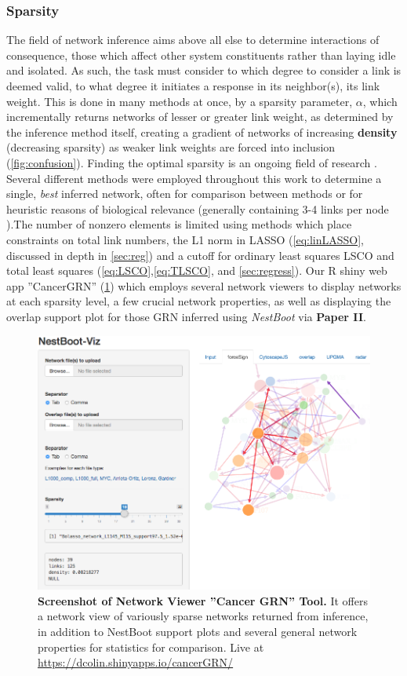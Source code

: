 \subsubsection{Sparsity}
\label{sec:spar}
The field of network inference aims above all else to determine interactions of consequence, those which affect other system constituents rather than laying idle and isolated. As such, the task must consider to which degree to consider a link is deemed valid, to what degree it initiates a response in its neighbor(s), \ie its link weight. This is done in many methods at once, by a sparsity parameter, $\alpha$, which incrementally returns networks of lesser or greater link weight, as determined by the inference method itself, creating a gradient of networks of increasing \textbf{density} (decreasing sparsity) as weaker link weights are forced into inclusion (\cref{fig:confusion}). Finding the optimal sparsity is an ongoing field of research \citep{tjarnberg2013optimal}. Several different methods were employed throughout this work to determine a single, \emph{best} inferred network, often for comparison between methods or for heuristic reasons of biological relevance (\ie generally containing 3-4 links per node \cite{tjarnberg2013optimal}).The number of nonzero elements is limited using methods which place constraints on total link numbers, \eg the L1 norm in LASSO (\cref{eq:linLASSO}, discussed in depth in \cref{sec:reg}) and a cutoff for ordinary least squares LSCO and total least squares (\cref{eq:LSCO},\cref{eq:TLSCO}, and \cref{sec:regress}). Our R shiny web app ''CancerGRN'' (\cref{fig:GSweb}) which employs several network viewers to display networks at each sparsity level, a few crucial network properties, as well as displaying the overlap support plot for those GRN inferred using \emph{NestBoot} via \textbf{Paper II}.


\begin{figure}
\centering
\includegraphics[width=1\linewidth]{4/NestBoot-Viz2.png}
\caption{\textbf{Screenshot of Network Viewer ''Cancer GRN'' Tool.} It offers a network view of variously sparse networks returned from inference, in addition to NestBoot support plots and several general network properties for statistics for comparison. Live at \url{https://dcolin.shinyapps.io/cancerGRN/}}
\label{fig:GSweb}
\end{figure}

